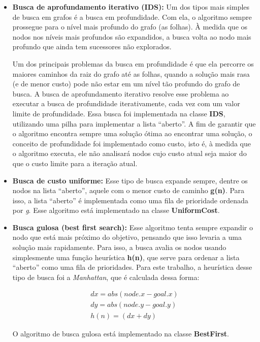 \documentclass[12pt]{article}
\begin{document}
\begin{itemize}
	\item \textbf{Busca de aprofundamento iterativo (IDS):} Um dos tipos mais simples de busca em grafos é a busca em profundidade. Com ela, o algoritmo sempre prossegue para o nível mais profundo do grafo (as folhas). À medida que os nodos nos níveis mais profundos são expandidos, a busca volta ao nodo mais profundo que ainda tem sucessores não explorados.

	Um dos principais problemas da busca em profundidade é que ela percorre os maiores caminhos da raiz do grafo até as folhas, quando a solução mais rasa (e de menor custo) pode não estar em um nível tão profundo do grafo de busca. A busca de aprofundamento iterativo resolve esse problema ao executar a busca de profundidade iterativamente, cada vez com um valor limite de profundidade. Essa busca foi implementada na classe \textbf{IDS}, utilizando uma pilha para implementar a lista ``aberto''. A fim de garantir que o algoritmo encontra sempre uma solução ótima ao encontrar uma solução, o conceito de profundidade foi implementado como custo, isto é, à medida que o algoritmo executa, ele não analisará nodos cujo custo atual seja maior do que o custo limite para a iteração atual.

	\item \textbf{Busca de custo uniforme:} Esse tipo de busca expande sempre, dentre os nodos na lista ``aberto'', aquele com o menor custo de caminho \textbf{g(n)}. Para isso, a lista ``aberto'' é implementada como uma fila de prioridade ordenada por \textit{g}. Esse algoritmo está implementado na classe \textbf{UniformCost}.

	\item \textbf{Busca gulosa (best first search):} Esse algoritmo tenta sempre expandir o nodo que está mais próximo do objetivo, pensando que isso levaria a uma solução mais rapidamente. Para isso, a busca avalia os nodos usando simplesmente uma função heurística \textbf{h(n)}, que serve para ordenar a lista ``aberto'' como uma fila de prioridades. Para este trabalho, a heurística desse tipo de busca foi a \textit{Manhattan}, que é calculada dessa forma:

	\begin{align*}
		dx = abs(node.x - goal.x) \\
		dy = abs(node.y - goal.y) \\
		h(n) = (dx + dy)
	\end{align*}

	O algoritmo de busca gulosa está implementado na classe \textbf{BestFirst}.


\end{itemize}
\end{document}
